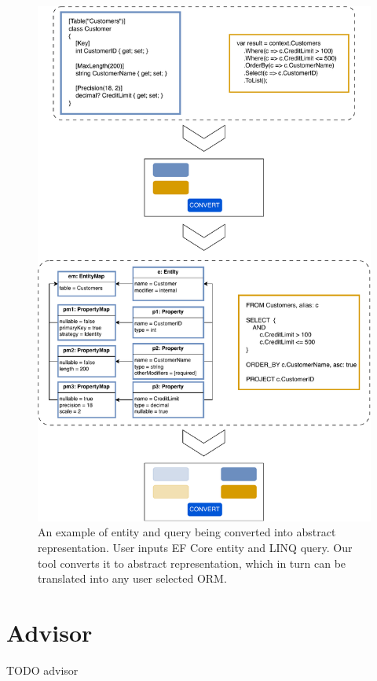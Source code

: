 \begin{figure}[H]
  \centering
  \includegraphics[width=\textwidth]{thesis/img/thesis/03_core_concepts.drawio.pdf}
  \caption{An example of entity and query being converted into abstract representation. User inputs EF Core entity and LINQ query. Our tool converts it to abstract representation, which in turn can be translated into any user selected ORM.}
  \label{fig:orm_to_abstract}
\end{figure}

\section{Advisor}
TODO advisor